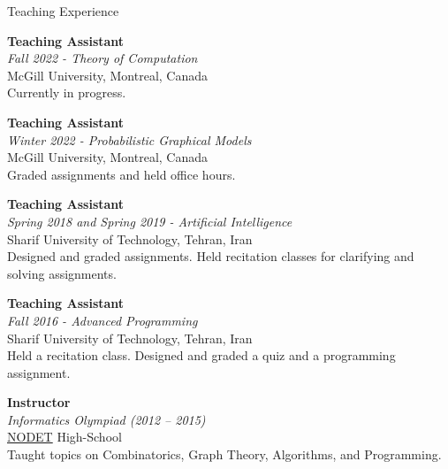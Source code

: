 \documentclass{resume}
\newcommand{\InternalSpace}{\vspace{0.18cm}}
\newcommand{\ExternalSpace}{\vspace{-0.09cm}}
\newenvironment{MySection}[1]
{\begin{category}{#1}}
{\end{category}}
\newcommand{\MyItem}{\citembullet}
\begin{document}
\begin{MySection}{Teaching Experience}

\MyItem \textbf{Teaching Assistant}\\
\textit{Fall 2022 - Theory of Computation}\\
McGill University, Montreal, Canada\\
\InternalSpace\ExternalSpace
Currently in progress.
\InternalSpace\ExternalSpace

\MyItem \textbf{Teaching Assistant}\\
\textit{Winter 2022 - Probabilistic Graphical Models}\\
McGill University, Montreal, Canada\\
\InternalSpace\ExternalSpace
Graded assignments and held office hours.
\InternalSpace\ExternalSpace

\MyItem \textbf{Teaching Assistant}\\
\textit{Spring 2018 and Spring 2019 - Artificial Intelligence}\\
Sharif University of Technology, Tehran, Iran\\
\InternalSpace\ExternalSpace
Designed and graded assignments.
Held recitation classes for clarifying and solving assignments.
\InternalSpace\ExternalSpace

\MyItem \textbf{Teaching Assistant}\\
\textit{Fall 2016 - Advanced Programming}\\
Sharif University of Technology, Tehran, Iran\\
\InternalSpace\ExternalSpace
Held a recitation class.
Designed and graded a quiz and a programming assignment.
\InternalSpace\ExternalSpace

\MyItem \textbf{Instructor} \hfill{}\\ 
\textit{Informatics Olympiad (2012 -- 2015)}\\
\href{https://en.wikipedia.org/wiki/National_Organization_for_Development_of_Exceptional_Talents}{NODET} High-School\\
\InternalSpace\ExternalSpace
Taught topics on Combinatorics, Graph Theory, Algorithms, and Programming.
\InternalSpace\ExternalSpace

\end{MySection}
\end{document}
